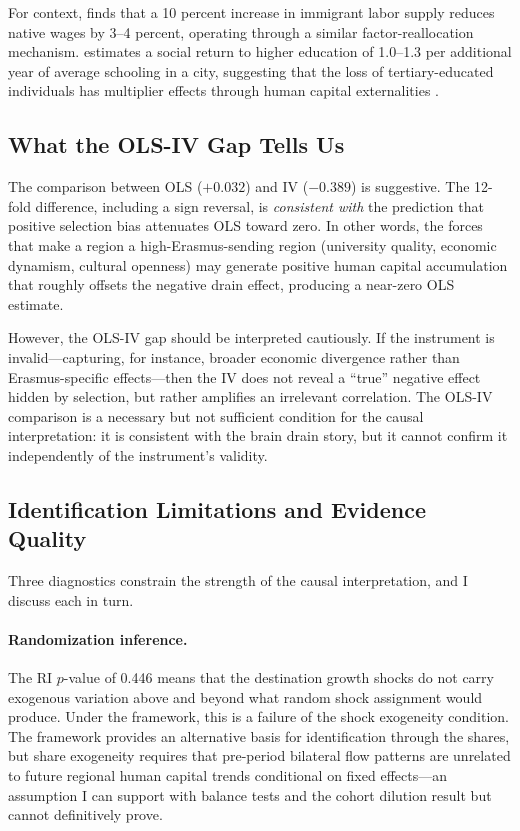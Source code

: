 \documentclass[12pt]{article}
\begin{document}
For context, \citet{borjas_2003} finds that a 10 percent increase in immigrant labor supply reduces native wages by 3--4 percent, operating through a similar factor-reallocation mechanism. \citet{moretti_2004} estimates a social return to higher education of 1.0--1.3 per additional year of average schooling in a city, suggesting that the loss of tertiary-educated individuals has multiplier effects through human capital externalities \citep{moretti_2011, glaeser_saiz_2004}.

\subsection{What the OLS-IV Gap Tells Us}

The comparison between OLS ($+0.032$) and IV ($-0.389$) is suggestive. The 12-fold difference, including a sign reversal, is \textit{consistent with} the prediction that positive selection bias attenuates OLS toward zero. In other words, the forces that make a region a high-Erasmus-sending region (university quality, economic dynamism, cultural openness) may generate positive human capital accumulation that roughly offsets the negative drain effect, producing a near-zero OLS estimate.

However, the OLS-IV gap should be interpreted cautiously. If the instrument is invalid---capturing, for instance, broader economic divergence rather than Erasmus-specific effects---then the IV does not reveal a ``true'' negative effect hidden by selection, but rather amplifies an irrelevant correlation. The OLS-IV comparison is a necessary but not sufficient condition for the causal interpretation: it is consistent with the brain drain story, but it cannot confirm it independently of the instrument's validity.

\subsection{Identification Limitations and Evidence Quality}

Three diagnostics constrain the strength of the causal interpretation, and I discuss each in turn.

\paragraph{Randomization inference.} The RI $p$-value of 0.446 means that the destination growth shocks do not carry exogenous variation above and beyond what random shock assignment would produce. Under the \citet{borusyak_hull_jaravel_2022} framework, this is a failure of the shock exogeneity condition. The \citet{goldsmith_pinkham_sorkin_swift_2020} framework provides an alternative basis for identification through the shares, but share exogeneity requires that pre-period bilateral flow patterns are unrelated to future regional human capital trends conditional on fixed effects---an assumption I can support with balance tests and the cohort dilution result but cannot definitively prove.
\end{document}
